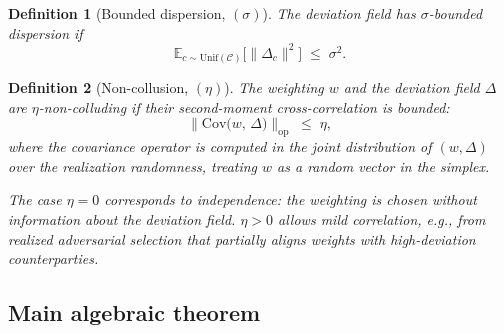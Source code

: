 \documentclass{article}
\newtheorem{definition}{Definition}
\begin{document}
\begin{definition}[Bounded dispersion, $(\sigma)$]
\label{def:disp}
The deviation field has \emph{$\sigma$-bounded dispersion} if
\begin{equation}
\label{eq:disp}
  \mathbb{E}_{c \sim \mathrm{Unif}(\mathcal{C})}\big[ \|\Delta_c\|^2 \big]
  \;\leq\; \sigma^2.
\end{equation}
\end{definition}

\begin{definition}[Non-collusion, $(\eta)$]
\label{def:ncol}
The weighting $w$ and the deviation field $\Delta$ are
\emph{$\eta$-non-colluding} if their second-moment cross-correlation is bounded:
\begin{equation}
\label{eq:ncol}
  \big\| \mathrm{Cov}\bigl(w,\, \Delta\bigr) \big\|_{\mathrm{op}}
  \;\leq\; \eta,
\end{equation}
where the covariance operator is computed in the joint distribution
of $(w, \Delta)$ over the realization randomness, treating $w$ as
a random vector in the simplex.

The case $\eta = 0$ corresponds to \emph{independence}: the
weighting is chosen without information about the deviation
field.  $\eta > 0$ allows mild correlation, e.g., from
realized adversarial selection that partially aligns weights with
high-deviation counterparties.
\end{definition}

\subsection{Main algebraic theorem}
\end{document}
